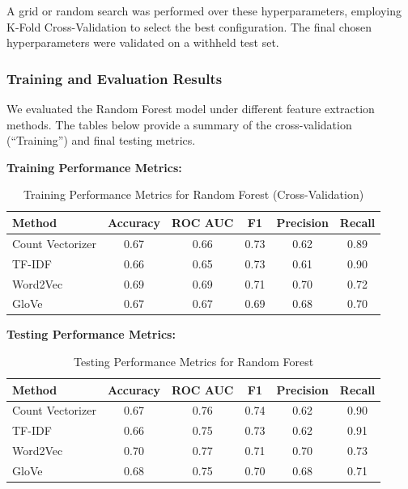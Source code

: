 A grid or random search was performed over these hyperparameters, employing K-Fold Cross-Validation to select the best configuration. The final chosen hyperparameters were validated on a withheld test set.

\subsubsection{Training and Evaluation Results}

We evaluated the Random Forest model under different feature extraction methods. The tables below provide a summary of the cross-validation (“Training”) and final testing metrics.

\textbf{Training Performance Metrics:}

\begin{table}[H]
    \centering
    \caption{Training Performance Metrics for Random Forest (Cross-Validation)}
    \label{tab:rf-training-metrics}
    \begin{tabular}{|l|c|c|c|c|c|}
        \hline
        \textbf{Method} & \textbf{Accuracy} & \textbf{ROC AUC} & \textbf{F1} & \textbf{Precision} & \textbf{Recall} \\ 
        \hline
        Count Vectorizer & 0.67 & 0.66 & 0.73 & 0.62 & 0.89 \\ 
        \hline
        TF-IDF & 0.66 & 0.65 & 0.73 & 0.61 & 0.90 \\ 
        \hline
        Word2Vec & 0.69 & 0.69 & 0.71 & 0.70 & 0.72 \\ 
        \hline
        GloVe & 0.67 & 0.67 & 0.69 & 0.68 & 0.70 \\ 
        \hline
    \end{tabular}
\end{table}

\textbf{Testing Performance Metrics:}

\begin{table}[H]
    \centering
    \caption{Testing Performance Metrics for Random Forest}
    \label{tab:rf-testing-metrics}
    \begin{tabular}{|l|c|c|c|c|c|}
        \hline
        \textbf{Method} & \textbf{Accuracy} & \textbf{ROC AUC} & \textbf{F1} & \textbf{Precision} & \textbf{Recall} \\ 
        \hline
        Count Vectorizer & 0.67 & 0.76 & 0.74 & 0.62 & 0.90 \\ 
        \hline
        TF-IDF & 0.66 & 0.75 & 0.73 & 0.62 & 0.91 \\ 
        \hline
        Word2Vec & 0.70 & 0.77 & 0.71 & 0.70 & 0.73 \\ 
        \hline
        GloVe & 0.68 & 0.75 & 0.70 & 0.68 & 0.71 \\ 
        \hline
    \end{tabular}
\end{table}

